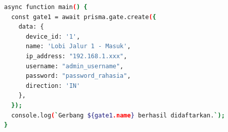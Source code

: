 \begin{minipage}{\textwidth}
\begin{lstlisting}[language=bash, caption={Logika Inisialisasi Data Gerbang pada \texttt{seed-gate.ts}}, label={lst:seed_logic}, frame=single, captionpos=t]
async function main() {
  const gate1 = await prisma.gate.create({
    data: {
      device_id: '1',
      name: 'Lobi Jalur 1 - Masuk',
      ip_address: "192.168.1.xxx",
      username: "admin_username",
      password: "password_rahasia",
      direction: 'IN'
    },
  });
  console.log(`Gerbang ${gate1.name} berhasil didaftarkan.`);
}
\end{lstlisting}
\end{minipage}